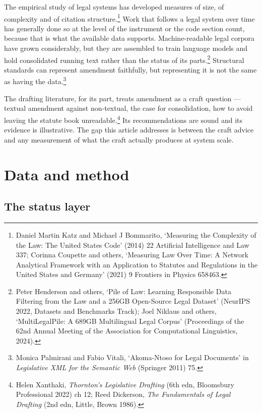 \documentclass[11pt]{article}
\begin{document}
The empirical study of legal systems has developed measures of size, of
complexity and of citation structure.\footnote{Daniel Martin Katz and Michael
J Bommarito, `Measuring the Complexity of the Law: The United States Code'
(2014) 22 Artificial Intelligence and Law 337; Corinna Coupette and others,
`Measuring Law Over Time: A Network Analytical Framework with an Application
to Statutes and Regulations in the United States and Germany' (2021) 9
Frontiers in Physics 658463.} Work that follows a legal system over time has
generally done so at the level of the instrument or the code section count,
because that is what the available data supports. Machine-readable legal
corpora have grown considerably, but they are assembled to train language
models and hold consolidated running text rather than the status of its
parts.\footnote{Peter Henderson and others, `Pile of Law: Learning
Responsible Data Filtering from the Law and a 256GB Open-Source Legal
Dataset' (NeurIPS 2022, Datasets and Benchmarks Track); Joel Niklaus and
others, `MultiLegalPile: A 689GB Multilingual Legal Corpus' (Proceedings of
the 62nd Annual Meeting of the Association for Computational Linguistics,
2024).} Structural standards can represent amendment faithfully, but
representing it is not the same as having the data.\footnote{Monica
Palmirani and Fabio Vitali, `Akoma-Ntoso for Legal Documents' in
\emph{Legislative XML for the Semantic Web} (Springer 2011) 75.}

The drafting literature, for its part, treats amendment as a craft question
--- textual amendment against non-textual, the case for consolidation, how to
avoid leaving the statute book unreadable.\footnote{Helen Xanthaki,
\emph{Thornton's Legislative Drafting} (6th edn, Bloomsbury Professional
2022) ch 12; Reed Dickerson, \emph{The Fundamentals of Legal Drafting} (2nd
edn, Little, Brown 1986).} Its recommendations are sound and its evidence is
illustrative. The gap this article addresses is between the craft advice and
any measurement of what the craft actually produces at system scale.

\section{Data and method}
\label{sec:method}

\subsection{The status layer}
\end{document}

